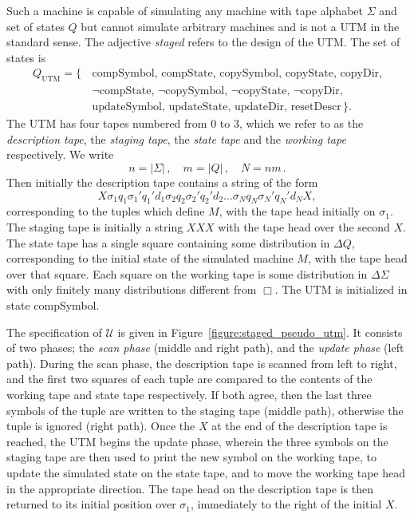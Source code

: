 \documentclass[english,letter paper,12pt,reqno]{article}
\theoremstyle{definition}
\def\be{\begin{equation}}
\def\ee{\end{equation}}
\begin{document}
Such a machine is capable of simulating any machine with tape alphabet $\Sigma$ and set of states $Q$ but cannot simulate arbitrary machines and is not a UTM in the standard sense. The adjective \emph{staged} refers to the design of the UTM. The set of states is
\begin{align*}
Q_{\text{UTM}} = \{\,
  & \text{compSymbol, compState, copySymbol, copyState, copyDir,} \\
  & \text{$\neg$compState, $\neg$copySymbol, $\neg$copyState, $\neg$copyDir,}\\
  & \text{updateSymbol, updateState, updateDir, resetDescr} \,\}.
\end{align*}
The UTM has four tapes numbered from 0 to 3, which we refer to as the \textit{description tape}, the \textit{staging tape}, the \textit{state tape} and the \textit{working tape} respectively. We write
\be
n = |\Sigma|\,, \quad m = |Q|\,, \quad N = nm\,.
\ee
Then initially the description tape contains a string of the form
\[
X\sigma_1q_1\sigma_1'q_1'd_1\sigma_2q_2\sigma_2'q_2'd_2 \dots \sigma_Nq_N\sigma_N'q_N'd_NX,
\]
corresponding to the tuples which define $M$, with the tape head initially on $\sigma_1$. The staging tape is initially a string $XXX$ with the tape head over the second $X$. The state tape has a single square containing some distribution in $\Delta Q$, corresponding to the initial state of the simulated machine $M$, with the tape head over that square. Each square on the working tape is some distribution in $\Delta \Sigma$ with only finitely many distributions different from $\Box$. The UTM is initialized in state compSymbol.

The specification of $\mathcal{U}$ is given in Figure~\ref{figure:staged_pseudo_utm}. It consists of two phases; the \textit{scan phase} (middle and right path), and the \textit{update phase} (left path). During the scan phase, the description tape is scanned from left to right, and the first two squares of each tuple are compared to the contents of the working tape and state tape respectively. If both agree, then the last three symbols of the tuple are written to the staging tape (middle path), otherwise the tuple is ignored (right path). Once the $X$ at the end of the description tape is reached, the UTM begins the update phase, wherein the three symbols on the staging tape are then used to print the new symbol on the working tape, to update the simulated state on the state tape, and to move the working tape head in the appropriate direction. The tape head on the description tape is then returned to its initial position over $\sigma_1$, immediately to the right of the initial $X$.
\end{document}
